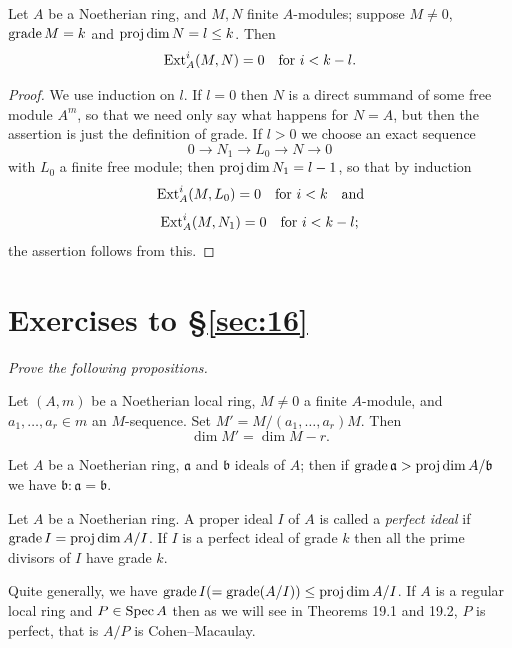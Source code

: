 \begin{theorem}\label{thm:16.9}
Let $A$ be a Noetherian ring, and $M, N$ finite $A$-modules;
suppose $M \neq 0$, $\operatorname{grade} M = k$ and $\operatorname{proj\,dim} N = l \le k$. Then
\[
  \operatorname{Ext}^i_A(M, N) = 0 \quad \text{for } i < k - l.
\]
\end{theorem}

\begin{proof}
We use induction on $l$. If $l = 0$ then $N$ is a direct summand of some
free module $A^m$, so that we need only say what happens for $N = A$, but
then the assertion is just the definition of grade. If $l > 0$ we choose an
exact sequence
\[
  0 \to N_1 \to L_0 \to N \to 0
\]
with $L_0$ a finite free module; then $\operatorname{proj\,dim} N_1 = l - 1$, so that by induction
\[
  \operatorname{Ext}^i_A(M, L_0) = 0 \quad \text{for } i < k \quad \text{and}
\]
\[
  \operatorname{Ext}^i_A(M, N_1) = 0 \quad \text{for } i < k - l;
\]
the assertion follows from this.
\end{proof}

\section*{Exercises to \S\ref{sec:16}}
\emph{Prove the following propositions.}

\begin{exercise}\label{ex:16.1-ex}
Let $(A, m)$ be a Noetherian local ring, $M \neq 0$ a finite $A$-module, and
$a_1, \ldots, a_r \in m$ an $M$-sequence. Set $M' = M/(a_1, \ldots, a_r)M$. Then
\[
  \dim M' = \dim M - r.
\]
\end{exercise}

\begin{exercise}\label{ex:16.2-ex}
Let $A$ be a Noetherian ring, $\mathfrak{a}$ and $\mathfrak{b}$ ideals of $A$; then if $\operatorname{grade} \mathfrak{a}
> \operatorname{proj\,dim} A/\mathfrak{b}$ we have $\mathfrak{b}:\mathfrak{a} = \mathfrak{b}$.
\end{exercise}

\begin{exercise}\label{ex:16.3-ex}
Let $A$ be a Noetherian ring. A proper ideal $I$ of $A$ is called a \emph{perfect ideal} if
$\operatorname{grade} I = \operatorname{proj\,dim} A/I$. If $I$ is a perfect ideal of grade $k$ then all the prime
divisors of $I$ have grade $k$.
\end{exercise}

\begin{remark}
Quite generally, we have $\operatorname{grade} I (=\operatorname{grade}(A/I)) \le \operatorname{proj\,dim} A/I$. If $A$ is a
regular local ring and $P \in \operatorname{Spec} A$ then as we will see in Theorems 19.1 and 19.2, $P$ is
perfect, that is $A/P$ is Cohen--Macaulay.
\end{remark}

